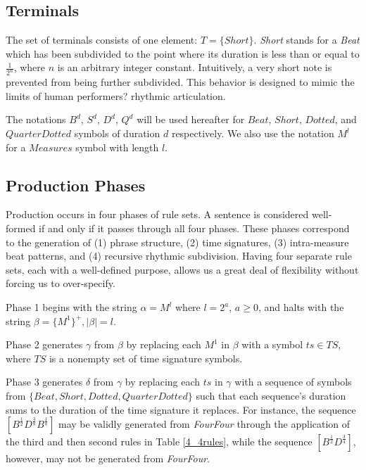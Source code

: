 \documentclass{article}
\begin{document}
\subsection{Terminals}

The set of terminals consists of one element: $T=\{Short\}$. \emph{Short} stands for a \emph{Beat} which has been subdivided to the point where its duration is less than or equal to $\frac{1}{2^n}$, where $n$ is an arbitrary integer constant. Intuitively, a very short note is prevented from being further subdivided. This behavior is designed to mimic the limits of human performers? rhythmic articulation.

The notations $B^d$, $S^d$, $D^d$, $Q^d$ will be used hereafter for $Beat$, $Short$, $Dotted$, and $QuarterDotted$ symbols of duration $d$ respectively. We also use the notation $M^l$ for a $Measures$ symbol with length $l$.

\subsection{Production Phases}

Production occurs in four phases of rule sets. A sentence is considered well-formed if and only if it passes through all four phases. These phases correspond to the generation of (1) phrase structure, (2) time signatures, (3) intra-measure beat patterns, and (4) recursive rhythmic subdivision. Having four separate rule sets, each with a well-defined purpose, allows us a great deal of flexibility without forcing us to over-specify.

Phase 1 begins with the string $\alpha = M^l$ where $l=2^a$, $a \geq 0$, and halts with the string $\beta = \{ M^1 \}^{+}, |\beta| = l$.

Phase 2 generates $\gamma$ from $\beta$ by replacing each $M^1$ in $\beta$ with a symbol $ts \in TS$, where $TS$ is a nonempty set of time signature symbols.

Phase 3 generates $\delta$ from $\gamma$ by replacing each $ts$ in $\gamma$ with a sequence of symbols from $\{Beat,\allowbreak Short,\allowbreak Dotted,\allowbreak QuarterDotted \}$ such that each sequence's duration sums to the duration of the time signature it replaces. For instance, the sequence
$[B^\frac{1}{2} D^\frac{3}{8} B^\frac{1}{8}]$ may be validly generated from \emph{FourFour} through the application of the third and then second rules in Table \ref{4_4rules}, 
while the sequence $[B^\frac{1}{2} D^\frac{3}{4}]$, however, may not be generated from \emph{FourFour}.
\end{document}
